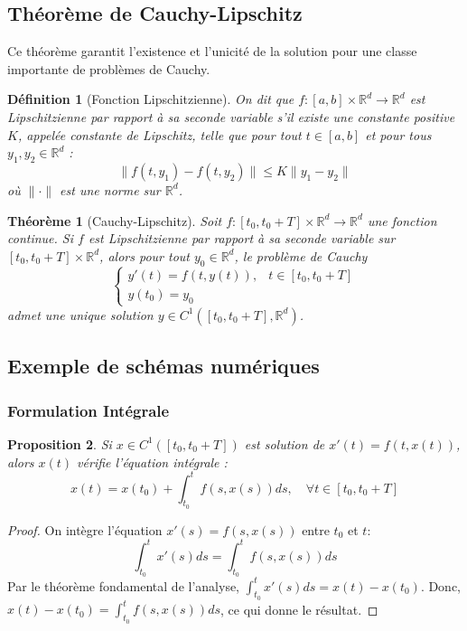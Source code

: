 \documentclass{article}
\newtheorem{theorem}{Théorème}
\newtheorem{proposition}[theorem]{Proposition}
\newtheorem{definition}{Définition}
\begin{document}
\subsection{Théorème de Cauchy-Lipschitz}
Ce théorème garantit l'existence et l'unicité de la solution pour une classe importante de problèmes de Cauchy.

\begin{definition}[Fonction Lipschitzienne]
On dit que $f: [a, b] \times \mathbb{R}^d \to \mathbb{R}^d$ est Lipschitzienne par rapport à sa seconde variable s'il existe une constante positive $K$, appelée constante de Lipschitz, telle que pour tout $t \in [a, b]$ et pour tous $y_1, y_2 \in \mathbb{R}^d$ :
\[ \|f(t, y_1) - f(t, y_2)\| \le K \|y_1 - y_2\| \]
où $\| \cdot \|$ est une norme sur $\mathbb{R}^d$.
\end{definition}

\begin{theorem}[Cauchy-Lipschitz]
Soit $f: [t_0, t_0 + T] \times \mathbb{R}^d \to \mathbb{R}^d$ une fonction continue.
Si $f$ est Lipschitzienne par rapport à sa seconde variable sur $[t_0, t_0 + T] \times \mathbb{R}^d$, alors pour tout $y_0 \in \mathbb{R}^d$, le problème de Cauchy
\[
\begin{cases}
    y'(t) = f(t, y(t)), & t \in [t_0, t_0 + T] \\
    y(t_0) = y_0
\end{cases}
\]
admet une unique solution $y \in C^1([t_0, t_0 + T], \mathbb{R}^d)$.
\end{theorem}

\subsection{Exemple de schémas numériques} %

\subsubsection{Formulation Intégrale} %
\begin{proposition}
Si $x \in C^1([t_0, t_0+T])$ est solution de $x'(t) = f(t, x(t))$, alors $x(t)$ vérifie l'équation intégrale :
\[ x(t) = x(t_0) + \int_{t_0}^t f(s, x(s)) ds, \quad \forall t \in [t_0, t_0+T] \]
\end{proposition}
\begin{proof}
On intègre l'équation $x'(s) = f(s, x(s))$ entre $t_0$ et $t$:
\[ \int_{t_0}^t x'(s) ds = \int_{t_0}^t f(s, x(s)) ds \]
Par le théorème fondamental de l'analyse, $\int_{t_0}^t x'(s) ds = x(t) - x(t_0)$.
Donc, $x(t) - x(t_0) = \int_{t_0}^t f(s, x(s)) ds$, ce qui donne le résultat.
\end{proof}
\end{document}
